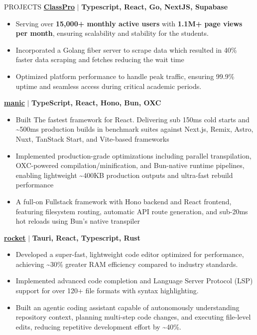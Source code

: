 \documentclass{resume} %
\begin{document}


\begin{rSection}{PROJECTS}    
    \textbf{\href{https://github.com/suduolabs/ClassPro}{ClassPro}} \(\mid\) \textbf{Typescript, React, Go, NextJS, Supabase}
\begin{itemize}
\itemsep -3pt{}
\item Serving over \textbf{15,000+ monthly active users} with \textbf{1.1M+ page views per month}, ensuring scalability and stability for the students.
\item Incorporated a Golang fiber server to scrape data which resulted in 40\% faster data scraping and fetches reducing the wait time
\item Optimized platform performance to handle peak traffic, ensuring 99.9\% uptime and seamless access during critical academic periods.
\end{itemize}

\textbf{\href{https://github.com/Rahuletto/manic}{manic}} \(\mid\) \textbf{TypeScript, React, Hono, Bun, OXC}
\begin{itemize}
\itemsep -3pt{}
\item Built The fastest framework for React. Delivering sub 150ms cold starts and \textasciitilde{}500ms production builds in benchmark suites against Next.js, Remix, Astro, Nuxt, TanStack Start, and Vite-based frameworks
\item Implemented production-grade optimizations including parallel transpilation, OXC-powered compilation/minification, and Bun-native runtime pipelines, enabling lightweight \textasciitilde{}400KB production outputs and ultra-fast rebuild performance
\item A full-on Fullstack framework with Hono backend and React frontend, featuring filesystem routing, automatic API route generation, and sub-20ms hot reloads using Bun’s native transpiler
\end{itemize}

\textbf{\href{https://github.com/Rahuletto/rocket}{rocket}} \(\mid\) \textbf{Tauri, React, Typescript, Rust}
\begin{itemize}
\itemsep -3pt{}
\item Developed a super-fast, lightweight code editor optimized for performance, achieving \textasciitilde{}30\% greater RAM efficiency compared to industry standards.
\item Implemented advanced code completion and Language Server Protocol (LSP) support for over 120+ file formats with syntax highlighting.
\item Built an agentic coding assistant capable of autonomously understanding repository context, planning multi-step code changes, and executing file-level edits, reducing repetitive development effort by \textasciitilde{}40\%.
\end{itemize}
\end{rSection}
\end{document}
